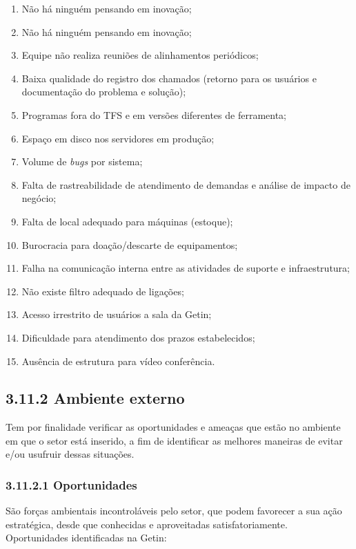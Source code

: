 \documentclass{article}
\begin{document}
\begin{enumerate}
    \item Não há ninguém pensando em inovação;
    \item Não há ninguém pensando em inovação;
    \item Equipe não realiza reuniões de alinhamentos periódicos;
    \item Baixa qualidade do registro dos chamados (retorno para os usuários e documentação do problema e solução);
    \item Programas fora do TFS e em versões diferentes de ferramenta;
    \item Espaço em disco nos servidores em produção;
    \item Volume de \textit{bugs} por sistema;
    \item Falta de rastreabilidade de atendimento de demandas e análise de impacto de negócio;
    \item Falta de local adequado para máquinas (estoque);
    \item Burocracia para doação/descarte de equipamentos;
    \item Falha na comunicação interna entre as atividades de suporte e infraestrutura;
    \item Não existe filtro adequado de ligações;
    \item Acesso irrestrito de usuários a sala da Getin;
    \item Dificuldade para atendimento dos prazos estabelecidos;
    \item Ausência de estrutura para vídeo conferência.
\end{enumerate}

\subsection*{3.11.2 Ambiente externo}

Tem por finalidade verificar as oportunidades e ameaças que estão no ambiente em que o setor está inserido, a fim de identificar as melhores maneiras de evitar e/ou usufruir dessas situações.

\subsubsection*{3.11.2.1 Oportunidades}

São forças ambientais incontroláveis pelo setor, que podem favorecer a sua ação estratégica, desde que conhecidas e aproveitadas satisfatoriamente.
Oportunidades identificadas na Getin:
\end{document}

